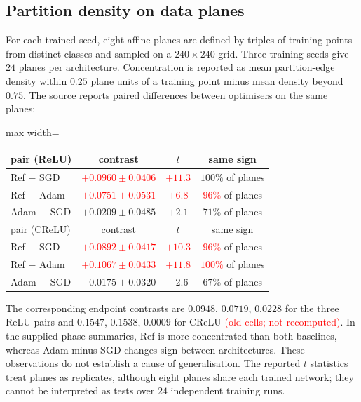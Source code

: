 \documentclass{article}
\newcommand{\nat}[1]{\textcolor{red}{#1}}
\theoremstyle{definition}
\theoremstyle{remark}
\begin{document}
\subsection{Partition density on data planes}\label{app:e11}

For each trained seed, eight affine planes are defined by triples of training points from distinct classes and sampled on a $240\times240$ grid. Three training seeds give $24$ planes per architecture. Concentration is reported as mean partition-edge density within $0.25$ plane units of a training point minus mean density beyond $0.75$. The source reports paired differences between optimisers on the same planes:

\begin{center}\small
\begin{adjustbox}{max width=\linewidth}
\begin{tabular}{lccc}
\toprule
pair (ReLU) & contrast & $t$ & same sign \\
\midrule
Ref $-$ SGD   & \nat{$+0.0960 \pm 0.0406$} & \nat{$+11.3$} & $100\%$ of planes \\
Ref $-$ Adam & \nat{$+0.0751 \pm 0.0531$} & \nat{$+6.8$}  & \nat{$96\%$} of planes \\
Adam $-$ SGD        & $+0.0209 \pm 0.0485$ & $+2.1$  & $71\%$ of planes \\
\midrule
pair (CReLU) & contrast & $t$ & same sign \\
\midrule
Ref $-$ SGD   & \nat{$+0.0892 \pm 0.0417$} & \nat{$+10.3$} & \nat{$96\%$} of planes \\
Ref $-$ Adam & \nat{$+0.1067 \pm 0.0433$} & \nat{$+11.8$} & \nat{$100\%$} of planes \\
Adam $-$ SGD        & $-0.0175 \pm 0.0320$ & $-2.6$ & $67\%$ of planes \\
\bottomrule
\end{tabular}
\end{adjustbox}
\end{center}

The corresponding endpoint contrasts are $0.0948$, $0.0719$, $0.0228$ for the three ReLU pairs and $0.1547$, $0.1538$, $0.0009$ for CReLU \nat{(old cells; not recomputed)}. In the supplied phase summaries, Ref is more concentrated than both baselines, whereas Adam minus SGD changes sign between architectures. These observations do not establish a cause of generalisation. The reported $t$ statistics treat planes as replicates, although eight planes share each trained network; they cannot be interpreted as tests over $24$ independent training runs.
\end{document}
